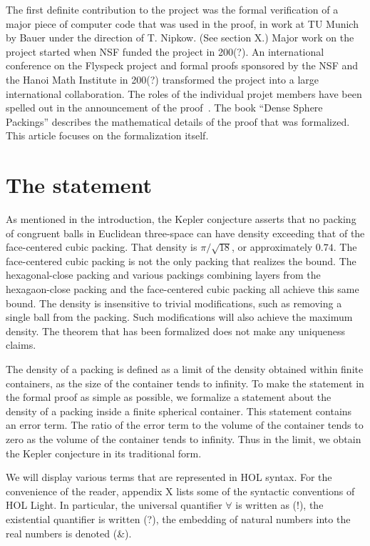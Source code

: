 The first definite contribution to the project was the formal
verification of a major piece of computer code that was used in the
proof, in work at TU Munich by Bauer under the direction of
T. Nipkow. (See section X.)  Major work on the project started when
NSF funded the project in 200(?).  An international conference on the
Flyspeck project and formal proofs sponsored by the NSF and the Hanoi
Math Institute in 200(?) transformed the project into a large
international collaboration.  The roles of the individual projet members
have been spelled out in the announcement of the proof~\cite{XX}.
The book ``Dense Sphere Packings''
describes the mathematical details of the proof that was formalized.
This article focuses on the formalization itself.



\section{The statement}

As mentioned in the introduction, 
the Kepler conjecture asserts that no packing of congruent balls in Euclidean three-space can have density exceeding
that of the face-centered cubic packing.  That density is $\pi/\sqrt{18}$, or approximately $0.74$.    The face-centered
cubic packing is not the only packing that realizes the bound.   The hexagonal-close packing and various packings
combining layers from the hexagaon-close packing and the face-centered cubic packing all achieve this same bound.
The density is insensitive to trivial modifications, such as removing a single ball from the packing.   Such modifications
will also achieve the maximum density.  The theorem that has been formalized does not make any
uniqueness claims.

The density of a packing is defined as a limit of the density obtained within finite containers, as the size of the container
tends to infinity.  To make the statement in the formal proof as simple as possible, we formalize a statement about the
density of a packing inside a finite spherical container.  This statement contains an error term.  The ratio
of the error term to the volume of the container  tends to zero as the volume of
the container tends to infinity.  Thus in the limit, we obtain the Kepler conjecture in its traditional form.


We will display various terms that are represented in HOL syntax.  For the convenience of the reader, appendix X lists
some of the syntactic conventions of HOL Light.  In particular, the universal quantifier $\forall$ is written as (!), the
existential quantifier is written (?),  the embedding of natural numbers into the real numbers is denoted (\&).




